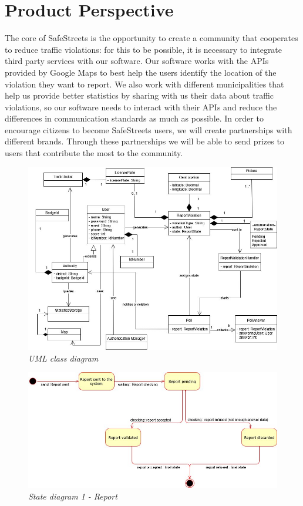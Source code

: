 \section{Product Perspective}
The core of SafeStreets is the opportunity to create a community that cooperates to reduce traffic violations: for this to be possible, it is necessary to integrate third party services with our software. 
Our software works with the APIs provided by Google Maps to best help the users identify the location of the violation they want to report.
We also work with different municipalities that help us provide better statistics by sharing with us their data about traffic violations, so our software needs to interact with their APIs and reduce the differences in communication standards as much as possible.
In order to encourage citizens to become SafeStreets users, we will create partnerships with different brands. Through these partnerships we will be able to send prizes to users that contribute the most to the community.

\begin{figure}[H]
  \centering
  \includegraphics[origin=c,width=\textwidth]{RASD_Images/uml.jpg}
  \caption{\textit{UML class diagram}}
\end{figure}

\begin{figure}[H]
  \centering
  \includegraphics[origin=c,width=\textwidth]{RASD_Images/StateDiagrams/state1.jpg}
  \caption{\textit{State diagram 1 - Report}}
\end{figure}

